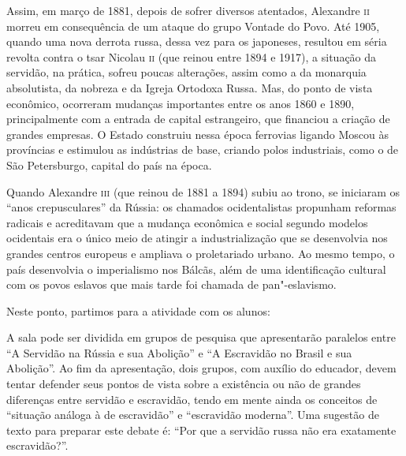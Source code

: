 \documentclass{article}
\begin{document}
Assim, em março de 1881, depois de sofrer diversos atentados, Alexandre
\textsc{ii} morreu em consequência de um ataque do grupo Vontade do Povo. Até
1905, quando uma nova derrota russa, dessa vez para os japoneses,
resultou em séria revolta contra o tsar Nicolau \textsc{ii} (que reinou entre
1894 e 1917), a situação da servidão, na prática, sofreu poucas
alterações, assim como a da monarquia absolutista, da nobreza e da
Igreja Ortodoxa Russa. Mas, do ponto de vista econômico, ocorreram
mudanças importantes entre os anos 1860 e 1890, principalmente com a
entrada de capital estrangeiro, que financiou a criação de grandes
empresas. O Estado construiu nessa época ferrovias ligando Moscou às
províncias e estimulou as indústrias de base, criando polos industriais,
como o de São Petersburgo, capital do país na época.



Quando Alexandre \textsc{iii} (que reinou de 1881 a 1894) subiu ao trono, se
iniciaram os ``anos crepusculares'' da Rússia: os chamados
ocidentalistas propunham reformas radicais e acreditavam que a mudança
econômica e social segundo modelos ocidentais era o único meio de
atingir a industrialização que se desenvolvia nos grandes centros
europeus e ampliava o proletariado urbano. Ao mesmo tempo, o país
desenvolvia o imperialismo nos Bálcãs, além de uma identificação
cultural com os povos eslavos que mais tarde foi chamada de
pan"-eslavismo.

Neste ponto, partimos para a atividade com os alunos:

A sala pode ser dividida em grupos de pesquisa que apresentarão
paralelos entre ``A Servidão na Rússia e sua Abolição'' e ``A Escravidão
no Brasil e sua Abolição''. Ao fim da apresentação, dois grupos, com
auxílio do educador, devem tentar defender seus pontos de vista sobre a
existência ou não de grandes diferenças entre servidão e escravidão,
tendo em mente ainda os conceitos de ``situação análoga à de
escravidão'' e ``escravidão moderna''. Uma sugestão de texto para
preparar este debate é: ``Por que a servidão russa não era exatamente
escravidão?''.

\end{document}
